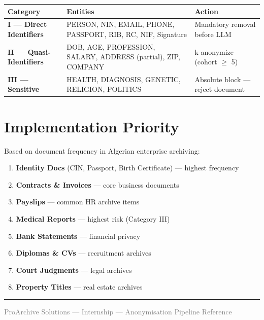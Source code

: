 \documentclass[11pt,a4paper]{article}
\begin{document}
\begin{longtable}{|p{3cm}|p{7cm}|p{5.5cm}|}
\hline
\textbf{Category} & \textbf{Entities} & \textbf{Action} \\
\hline
\endhead

\textcolor{catI}{\textbf{I --- Direct Identifiers}}
&
PERSON, NIN, EMAIL, PHONE, PASSPORT, RIB, RC, NIF, Signature
&
Mandatory removal before LLM
\\ \hline

\textcolor{catII}{\textbf{II --- Quasi-Identifiers}}
&
DOB, AGE, PROFESSION, SALARY, ADDRESS (partial), ZIP, COMPANY
&
k-anonymize (cohort $\geq$ 5)
\\ \hline

\textcolor{catIII}{\textbf{III --- Sensitive}}
&
HEALTH, DIAGNOSIS, GENETIC, RELIGION, POLITICS
&
Absolute block --- reject document
\\ \hline

\end{longtable}

\section{Implementation Priority}

Based on document frequency in Algerian enterprise archiving:

\begin{enumerate}
    \item \textbf{Identity Docs} (CIN, Passport, Birth Certificate) --- highest frequency
    \item \textbf{Contracts \& Invoices} --- core business documents
    \item \textbf{Payslips} --- common HR archive items
    \item \textbf{Medical Reports} --- highest risk (Category III)
    \item \textbf{Bank Statements} --- financial privacy
    \item \textbf{Diplomas \& CVs} --- recruitment archives
    \item \textbf{Court Judgments} --- legal archives
    \item \textbf{Property Titles} --- real estate archives
\end{enumerate}

\vspace{20pt}
\hrule
\vspace{4pt}
{\footnotesize \textcolor{gray}{ProArchive Solutions --- Internship --- Anonymisation Pipeline Reference}}
\end{document}
